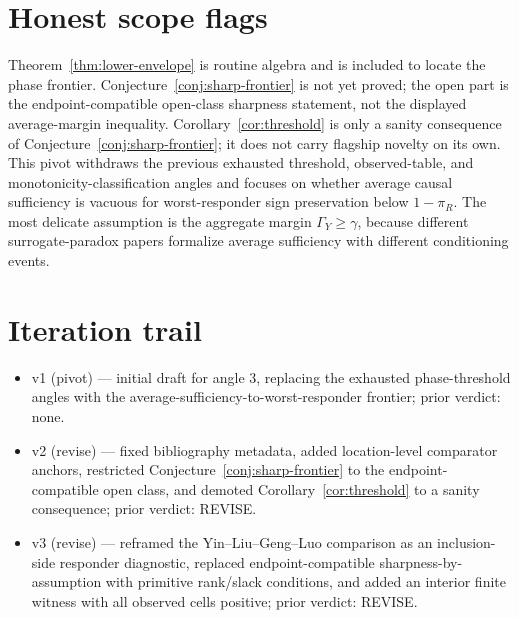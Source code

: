 \documentclass[11pt]{article}
\theoremstyle{definition}
\theoremstyle{plain}
\theoremstyle{remark}
\begin{document}
\section{Honest scope flags}
Theorem~\ref{thm:lower-envelope} is routine algebra and is included to locate the phase frontier.  Conjecture~\ref{conj:sharp-frontier} is not yet proved; the open part is the endpoint-compatible open-class sharpness statement, not the displayed average-margin inequality.  Corollary~\ref{cor:threshold} is only a sanity consequence of Conjecture~\ref{conj:sharp-frontier}; it does not carry flagship novelty on its own.  This pivot withdraws the previous exhausted threshold, observed-table, and monotonicity-classification angles and focuses on whether average causal sufficiency is vacuous for worst-responder sign preservation below \(1-\pi_R\).  The most delicate assumption is the aggregate margin \(\Gamma_Y\ge\gamma\), because different surrogate-paradox papers formalize average sufficiency with different conditioning events.

\section{Iteration trail}
\begin{itemize}[leftmargin=*]
\item v1 (pivot) --- initial draft for angle 3, replacing the exhausted phase-threshold angles with the average-sufficiency-to-worst-responder frontier; prior verdict: none.
\item v2 (revise) --- fixed bibliography metadata, added location-level comparator anchors, restricted Conjecture~\ref{conj:sharp-frontier} to the endpoint-compatible open class, and demoted Corollary~\ref{cor:threshold} to a sanity consequence; prior verdict: REVISE.
\item v3 (revise) --- reframed the Yin--Liu--Geng--Luo comparison as an inclusion-side responder diagnostic, replaced endpoint-compatible sharpness-by-assumption with primitive rank/slack conditions, and added an interior finite witness with all observed cells positive; prior verdict: REVISE.
\end{itemize}
\end{document}
